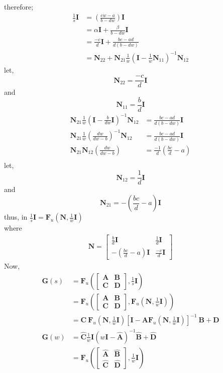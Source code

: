 \documentclass{scrreprt}
\begin{document}
therefore;
\begin{align*}
\frac{1}{s}\bm{I} &=  (\frac{cw-a}{b-dw}) \bm{I}\\
	&= \alpha\bm{I} + \frac{\beta}{b-dw}\bm{I}\\
	&= \frac{-c}{d}\bm{I} +  \frac{bc-ad}{d(b-dw)}\\
	&= \bm{N}_{22} + \bm{N}_{21}\frac{1}{w}(\bm{I}-\frac{1}{w}\bm{N}_{11})^{-1}\bm{N}_{12}
\end{align*}
let,
\begin{equation}
\bm{N}_{22}= \frac{-c}{d}\bm{I}
\label{eq:n22}
\end{equation}
and
\begin{equation}
\bm{N}_{11}= \frac{b}{d}\bm{I}
\label{eq:n11}
\end{equation}
\begin{align*}
\bm{N}_{21}\frac{1}{w}(\bm{I}-\frac{b}{dw}\bm{I})^{-1}\bm{N}_{12} &= \frac{bc-ad}{d(b-dw)}\bm{I} \\
\bm{N}_{21}\frac{1}{w}(\frac{dw}{dw-b})^{-1}\bm{N}_{12} &= \frac{bc-ad}{d(b-dw)}\bm{I} \\
\bm{N}_{21}\bm{N}_{12}(\frac{dw}{dw-b}) &= \frac{-1}{d}(\frac{bc}{d}-a)\\
\end{align*}
let,
\begin{equation}
\bm{N}_{12}= \frac{1}{d}\bm{I}
\label{eq:n12}
\end{equation}
and
\begin{equation}
\bm{N}_{21}= -(\frac{bc}{d}-a)\bm{I}
\label{eq:n21}
\end{equation}
thus, in $\frac{1}{s}\bm{I} = \bm{F}_u(\bm{N},\frac{1}{w}\bm{I})$\\
where\\
\begin{align*}
\bm{N}=
\begin{bmatrix}
\frac{b}{d}\bm{I} &  \frac{1}{d}\bm{I}\\
-(\frac{bc}{d}-a)\bm{I} & \frac{-c}{d}\bm{I}
\end{bmatrix}
\end{align*}
Now,
\begin{align*}
\bm{G}(s)&=\bm{F}_u(
\begin{bmatrix}
\bm{A} & \bm{B}\\
\bm{C} & \bm{D}
\end{bmatrix}, \frac{1}{s}\bm{I})\\
&=\bm{F}_u(
\begin{bmatrix}
\bm{A} & \bm{B}\\
\bm{C} & \bm{D}
\end{bmatrix}, \bm{F}_u(\bm{N},\frac{1}{w}\bm{I}))\\
&= \bm{C} \:\bm{F}_u(\bm{N},\frac{1}{w}\bm{I}) [\bm{I} - \bm{A}\bm{F}_u(\bm{N},\frac{1}{w}\bm{I})]^{-1} \: \bm{B} + \bm{D}\\
\bm{G}(w) &= \hat{\bm{C}}\frac{1}{w}\bm{I} (w\bm{I} - \hat{\bm{A}})^{-1} \hat{\bm{B}} + \hat{\bm{D}}\\
&=\bm{F}_u(
\begin{bmatrix}
\hat{\bm{A}} & \hat{\bm{B}}\\
\hat{\bm{C}} & \hat{\bm{D}}
\end{bmatrix}, \frac{1}{w}\bm{I})\\
\end{align*}
\end{document}
